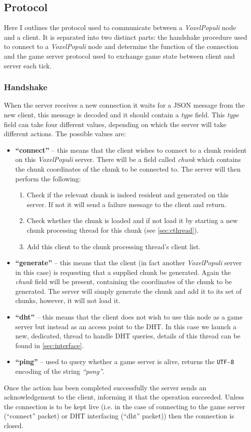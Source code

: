 \documentclass[12pt,notitlepage,a4paper]{report}
\newcommand{\voxpop}{\emph{VoxelPopuli}}
\begin{document}
	\subsection{Protocol}
	Here I outlines the protocol used to communicate between a \voxpop{} node and a client. It is separated into two distinct parts: the handshake procedure used to connect to a \voxpop{} node and determine the function of the connection and the game server protocol used to exchange game state between client and server each tick.
	\subsubsection{Handshake}
	\label{sec:handshake}
	When the server receives a new connection it waits for a JSON message from the new client, this message is decoded and it should contain a \emph{type} field. This \emph{type} field can take four different values, depending on which the server will take different actions. The possible values are:
	\begin{itemize}
		\item \textbf{``connect''} -- this means that the client wishes to connect to a chunk resident on this \voxpop{} server. There will be a field called \emph{chunk} which contains the chunk coordinates of the chunk to be connected to. The server will then perform the following:
		\begin{enumerate}
			\item Check if the relevant chunk is indeed resident and generated on this server. If not it will send a failure message to the client and return.
			\item Check whether the chunk is loaded and if not load it by starting a new chunk processing thread for this chunk (see \cref{sec:cthread}).
			\item Add this client to the chunk processing thread's client list.
		\end{enumerate}
		\item \textbf{``generate''} -- this means that the client (in fact another \voxpop{} server in this case) is requesting that a supplied chunk be generated. Again the \emph{chunk} field will be present, containing the coordinates of the chunk to be generated. The server will simply generate the chunk and add it to its set of chunks, however, it will not load it.
		\item \textbf{``dht''} -- this means that the client does not wish to use this node as a game server but instead as an access point to the DHT. In this case we launch a new, dedicated, thread to handle DHT queries, details of this thread can be found in \cref{sec:interface}.
		\item \textbf{``ping''} -- used to query whether a game server is alive, returns the \texttt{UTF-8} encoding of the string \emph{``pong''}.
	\end{itemize}
	Once the action has been completed successfully the server sends an acknowledgement to the client, informing it that the operation succeeded. Unless the connection is to be kept live (i.e. in the case of connecting to the game server (``connect'' packet) or DHT interfacing (``dht'' packet)) then the connection is closed.
	
\end{document}
